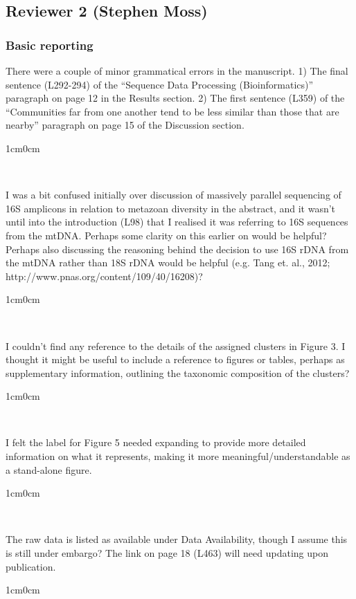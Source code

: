 \documentclass{article}
\newenvironment{response}
	{
	\begin{adjustwidth}{1cm}{0cm}
	\itshape %
	}
	{
	\end{adjustwidth}
	}
\begin{document}
\subsection*{Reviewer 2 (Stephen Moss)}
\subsubsection*{Basic reporting}
There were a couple of minor grammatical errors in the manuscript. 1) The final sentence (L292-294) of the “Sequence Data Processing (Bioinformatics)” paragraph on page 12 in the Results section. 2) The first sentence (L359) of the “Communities far from one another tend to be less similar than those that are nearby” paragraph on page 15 of the Discussion section.
\begin{response}
  \\
\end{response}

I was a bit confused initially over discussion of massively parallel sequencing of 16S amplicons in relation to metazoan diversity in the abstract, and it wasn’t until into the introduction (L98) that I realised it was referring to 16S sequences from the mtDNA. Perhaps some clarity on this earlier on would be helpful? Perhaps also discussing the reasoning behind the decision to use 16S rDNA from the mtDNA rather than 18S rDNA would be helpful (e.g. Tang et. al., 2012; http://www.pnas.org/content/109/40/16208)?
\begin{response}
  \\
\end{response}

I couldn’t find any reference to the details of the assigned clusters in Figure 3. I thought it might be useful to include a reference to figures or tables, perhaps as supplementary information, outlining the taxonomic composition of the clusters?
\begin{response}
  \\
\end{response}

I felt the label for Figure 5 needed expanding to provide more detailed information on what it represents, making it more meaningful/understandable as a stand-alone figure.
\begin{response}
  \\
\end{response}

The raw data is listed as available under Data Availability, though I assume this is still under embargo? The link on page 18 (L463) will need updating upon publication.
\begin{response}
  \\
\end{response}
\end{document}
